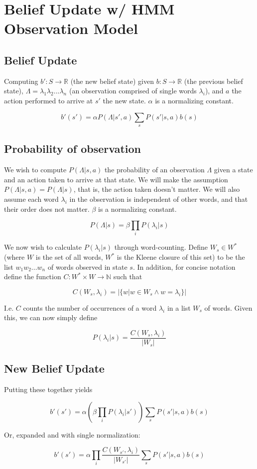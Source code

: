 \documentclass{article}
\begin{document}
\section{Belief Update w/ HMM Observation Model}

\subsection{Belief Update}
Computing $b' : S \rightarrow \mathbb{R}$ (the new belief state) given $b : S \rightarrow \mathbb{R}$ (the previous belief state), $\Lambda = \lambda_1\lambda_2...\lambda_n$ (an observation comprised of single words $\lambda_i$), and $a$ the action performed to arrive at $s'$ the new state. $\alpha$ is a normalizing constant.

$$
b'(s') = \alpha{}P(\Lambda | s', a)\sum_sP(s' | s, a)b(s)
$$

\subsection{Probability of observation}
We wish to compute $P(\Lambda | s, a)$ the probability of an observation $\Lambda$ given a state and an action taken to arrive at that state.  We will make the assumption $P(\Lambda | s, a) = P(\Lambda | s)$, that is, the action taken doesn't matter.  We will also assume each word $\lambda_i$ in the observation is independent of other words, and that their order does not matter. $\beta$ is a normalizing constant.

$$
P(\Lambda | s) = \beta{}\prod_iP(\lambda_i|s)
$$

We now wish to calculate $P(\lambda_i|s)$ through word-counting. Define $W_s \in W^*$ (where $W$ is the set of all words, $W^*$ is the Kleene closure of this set) to be the list $w_1w_2...w_n$ of words observed in state $s$.  In addition, for concise notation define the function $C : W^* \times W \rightarrow \mathbb{N}$ such that 

$$
C(W_s, \lambda_i) = |\{w|w \in W_s \land w = \lambda_i\}|
$$

I.e. $C$ counts the number of occurrences of a word $\lambda_i$ in a list $W_s$ of words.  Given this, we can now simply define

$$
P(\lambda_i|s) = \frac{C(W_s, \lambda_i)}{|W_s|}
$$

\subsection{New Belief Update}
Putting these together yields

$$
b'(s') = \alpha{}\left(\beta\prod_iP(\lambda_i|s')\right)\sum_sP(s' | s, a)b(s)
$$

Or, expanded and with single normalization:

$$
b'(s') = \alpha{}\prod_i\frac{C(W_{s'}, \lambda_i)}{|W_{s'}|}\sum_sP(s' | s, a)b(s)
$$
\end{document}
